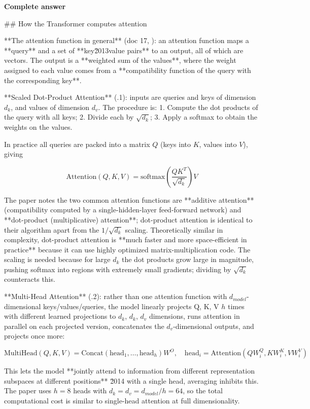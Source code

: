 \documentclass[10pt]{article}
\begin{document}
\textbf{Complete answer}
\begin{AnswerText}
## How the Transformer computes attention

**The attention function in general** (doc 17, ): an attention function maps a **query** and a set of **key\u2013value pairs** to an output, all of which are vectors. The output is a **weighted sum of the values**, where the weight assigned to each value comes from a **compatibility function of the query with the corresponding key**.

**Scaled Dot-Product Attention** (.1): inputs are queries and keys of dimension $d_k$, and values of dimension $d_v$. The procedure is:
1. Compute the dot products of the query with all keys;
2. Divide each by $\sqrt{d_k}$;
3. Apply a softmax to obtain the weights on the values.

In practice all queries are packed into a matrix $Q$ (keys into $K$, values into $V$), giving

$$\mathrm{Attention}(Q,K,V)=\mathrm{softmax}\!\left(\frac{QK^{T}}{\sqrt{d_k}}\right)V$$

The paper notes the two common attention functions are **additive attention** (compatibility computed by a single-hidden-layer feed-forward network) and **dot-product (multiplicative) attention**; dot-product attention is identical to their algorithm apart from the $1/\sqrt{d_k}$ scaling. Theoretically similar in complexity, dot-product attention is **much faster and more space-efficient in practice** because it can use highly optimized matrix-multiplication code. The scaling is needed because for large $d_k$ the dot products grow large in magnitude, pushing softmax into regions with extremely small gradients; dividing by $\sqrt{d_k}$ counteracts this.

**Multi-Head Attention** (.2): rather than one attention function with $d_{model}$-dimensional keys/values/queries, the model linearly projects Q, K, V $h$ times with different learned projections to $d_k$, $d_k$, $d_v$ dimensions, runs attention in parallel on each projected version, concatenates the $d_v$-dimensional outputs, and projects once more:

$$\mathrm{MultiHead}(Q,K,V)=\mathrm{Concat}(\mathrm{head}_1,\dots,\mathrm{head}_h)W^O,\quad \mathrm{head}_i=\mathrm{Attention}(QW_i^Q,KW_i^K,VW_i^V)$$

This lets the model **jointly attend to information from different representation subspaces at different positions** \u2014 with a single head, averaging inhibits this. The paper uses $h=8$ heads with $d_k=d_v=d_{model}/h=64$, so the total computational cost is similar to single-head attention at full dimensionality.


\end{AnswerText}
\end{document}
